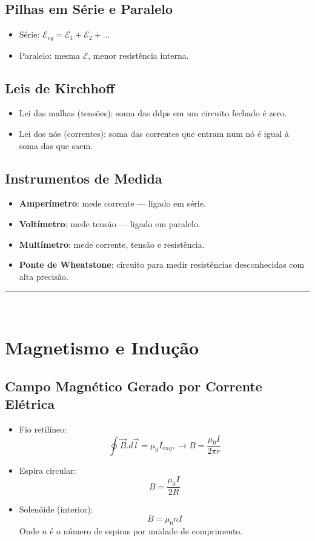 \documentclass[a4paper,12pt]{article}
\begin{document}
\begin{multicols}{2}
\subsection{Pilhas em Série e Paralelo}
\begin{itemize}
    \item Série: $ \mathcal{E}_{eq} = \mathcal{E}_1 + \mathcal{E}_2 + \dots$
    \item Paralelo: mesma $ \mathcal{E}$, menor resistência interna.
\end{itemize}

\subsection{Leis de Kirchhoff}
\begin{itemize}
    \item Lei das malhas (tensões): soma das ddps em um circuito fechado é zero.
    \item Lei dos nós (correntes): soma das correntes que entram num nó é igual à soma das que saem.
\end{itemize}

\subsection{Instrumentos de Medida}
\begin{itemize}
    \item \textbf{Amperímetro}: mede corrente — ligado em série.
    \item \textbf{Voltímetro}: mede tensão — ligado em paralelo.
    \item \textbf{Multímetro}: mede corrente, tensão e resistência.
    \item \textbf{Ponte de Wheatstone}: circuito para medir resistências desconhecidas com alta precisão.
\end{itemize}

\noindent\rule{\linewidth}{1pt}\\

\section{Magnetismo e Indução}

\subsection{Campo Magnético Gerado por Corrente Elétrica}
\begin{itemize}
    \item Fio retilíneo:
    \[
        \oint \vec{B}.d\vec{l} = \mu_{0}I_{eng}, \rightarrow B = \frac{\mu_0 I}{2\pi r}
    \]
    \item Espira circular:
    \[
        B = \frac{\mu_0 I}{2R}
    \]
    \item Solenóide (interior):
    \[
        B = \mu_0 n I
    \]
    Onde $n$ é o número de espiras por unidade de comprimento.
\end{itemize}


\end{multicols}
\end{document}
